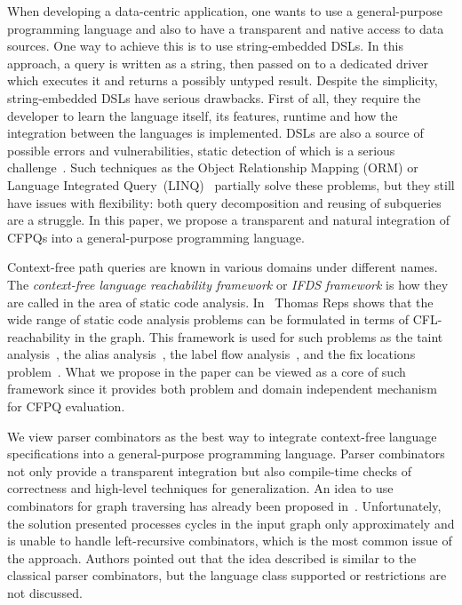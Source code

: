 When developing a data-centric application, one wants to use a general-purpose programming language and also to have a transparent and native access to data sources.
One way to achieve this is to use string-embedded DSLs.
In this approach, a query is written as a string, then passed on to a dedicated driver which executes it and returns a possibly untyped result.
Despite the simplicity, string-embedded DSLs have serious drawbacks.
First of all, they require the developer to learn the language itself, its features, runtime and how the integration between the languages is implemented.
DSLs are also a source of possible errors and vulnerabilities, static detection of which is a serious challenge~\cite{stringEmbeddedLanguagesProblem}.
Such techniques as the Object Relationship Mapping (ORM) or Language Integrated Query~(LINQ)~\cite{LINQ1, LINQ2, LinqRDF} partially solve these problems, but they still have issues with flexibility: both query decomposition and  reusing of subqueries are a struggle.
In this paper, we propose a transparent and natural integration of CFPQs into a general-purpose programming language.

Context-free path queries are known in various domains under different names. The \emph{context-free language reachability framework} or  \emph{IFDS framework} is how they are called in the area of static code analysis.
In~\cite{Reps:1995, Reps} Thomas Reps shows that the wide range of static code analysis problems can be formulated in terms of CFL-reachability in the graph.
This framework is used for such problems as the taint analysis~\cite{CFLTaint}, the alias analysis~\cite{JavaCFL, Zheng, CFLGraspan}, the label flow analysis~\cite{LabelFlowCFLReachability}, and the fix locations problem~\cite{CFLfinding}.
What we propose in the paper can be viewed as a core of such framework since it provides both problem and domain independent mechanism for CFPQ evaluation.

We view parser combinators as the best way to integrate context-free language specifications into a general-purpose programming language. Parser combinators not only provide a transparent integration but also compile-time checks of correctness and high-level techniques for generalization. An idea to use combinators for graph traversing has already been proposed in~\cite{ScalaGraphParsing}. Unfortunately, the solution presented processes cycles in the input graph only approximately and is unable to handle left-recursive combinators, which is the most common issue of the approach. Authors pointed out that the idea described is similar to the classical parser combinators, but the language class supported or restrictions are not discussed.

